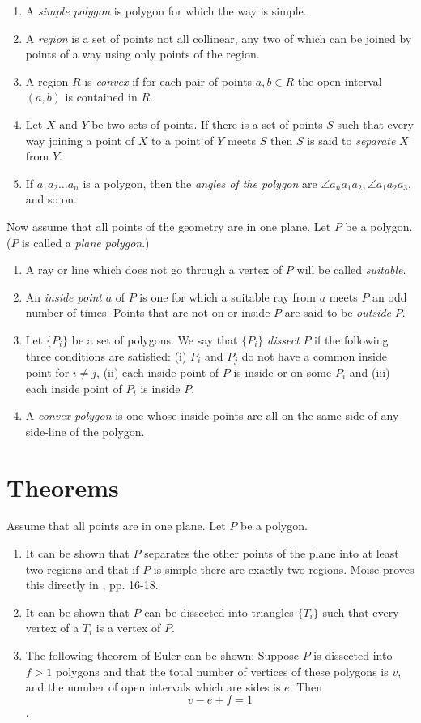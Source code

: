 \documentclass[12pt]{article}
\begin{document}
\begin{enumerate}
\item A \emph{simple polygon} is polygon for which the way is simple.
\item A \emph{region} is a set of points not all collinear, any two of which can be joined by points of a way using
only points of the region. 
\item A region $R$ is \emph{convex} if for each pair of points $a,b \in R$  the open interval $(a,b)$ is 
contained in $R.$
\item Let $X$ and $Y$ be two sets of points. If there is a set of points $S$ such that every way 
joining a point of $X$ to a point of $Y$ meets $S$ then $S$ is said to \emph{separate}
$X$ from $Y$. 
\item If $a_1 a_2 \ldots a_n$ is a polygon, then the \emph{angles of the polygon} are
$\angle a_na_1a_2, \angle a_1a_2a_3$, and so on. 
\end{enumerate}

Now assume that all points of the geometry are in one plane. Let $P$ be a polygon. ($P$ is called
a \emph{plane polygon}.)
\begin{enumerate} 
\item A ray or line which does not go through a vertex of $P$ will be called \emph{suitable}.
\item An  \emph{inside point} $a$ of $P$ is one for which a  suitable ray from $a$
meets $P$ an odd number of times. Points that are not on or inside $P$ are said to be \emph{outside} 
$P$. 
\item Let $\{P_i\}$ be a set of polygons. We say that $\{P_i\}$ \emph{dissect} $P$ if the following
three conditions are satisfied: (i) $P_i$ and $P_j$ do not have a common inside point for $i \not = j$,
(ii) each inside point of $P$ is inside or on some $P_i$ and (iii) each inside point of $P_i$ is
inside $P$.
\item A \emph{convex polygon} is one whose inside points are all on the same side of any side-line 
of the polygon. 
\end{enumerate}

\section{Theorems}
Assume that all points are in one plane. Let $P$ be a polygon.
\begin{enumerate}
\item It can be shown that $P$ separates the other points of the plane into at least two regions and that
if $P$ is simple there are exactly two regions. Moise proves this directly in \cite{moise}, pp. 16-18.
\item It can be shown that $P$ can be dissected into triangles $\{T_i\}$ such that 
every vertex of a $T_i$ is a vertex of $P$. 
\item The following theorem of Euler can be shown: Suppose  $P$ is dissected into $f>1$ polygons
and that the total number of vertices of these polygons is $v$, and the number of open intervals
which are sides is $e$. Then 
$$
v-e+f = 1
$$.
\end{enumerate}
 
\end{document}
